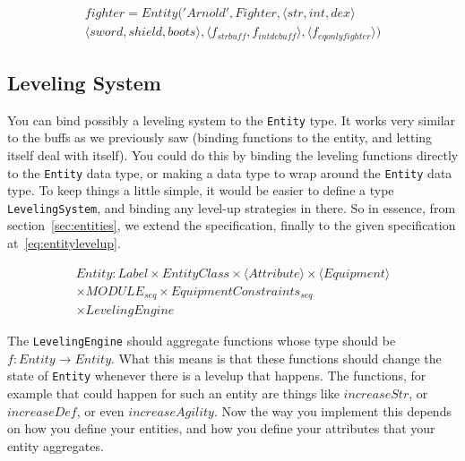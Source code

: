 \begin{equation}
\begin{split}
  \label{eq:createent}
  fighter = Entity('Arnold', Fighter, \langle str, int, dex \rangle \\
    \langle sword, shield, boots \rangle, \langle f_{strbuff}, f_{intdebuff}
  \rangle, \langle f_{eqonlyfighter} \rangle)
\end{split}
\end{equation}

\subsection{Leveling System}


You can bind possibly a leveling system to the \texttt{Entity} type. It works
very similar to the buffs as we previously saw (binding functions to the entity,
and letting itself deal with itself). You could do this by binding the leveling
functions directly to the \texttt{Entity} data type, or making a data type to
wrap around the \texttt{Entity} data type. To keep things a little simple, it
would be easier to define a type \texttt{LevelingSystem}, and binding any
level-up strategies in there. So in essence, from section~\ref{sec:entities}, we
extend the specification, finally to the given specification
at~\ref{eq:entitylevelup}.

\begin{equation}
  \begin{split}
  \label{eq:entitylevelup}
  Entity\colon Label \times
    EntityClass \times
    \langle Attribute \rangle \times
    \langle Equipment \rangle \\
    \times MODULE_{seq} \times EquipmentConstraints_{seq} \\
    \times LevelingEngine
  \end{split}
\end{equation}

The \texttt{LevelingEngine} should aggregate functions whose type should be
$f\colon Entity \to Entity$. What this means is that these functions should
change the state of \texttt{Entity} whenever there is a levelup that happens.
The functions, for example that could happen for such an entity are things like
$increaseStr$, or $increaseDef$, or even $increaseAgility$. Now the way you
implement this depends on how you define your entities, and how you define your
attributes that your entity aggregates.


